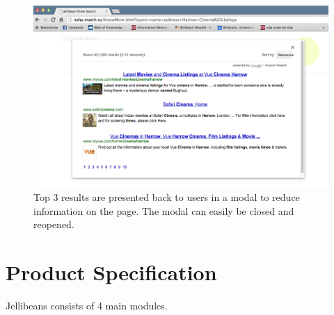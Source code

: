 \documentclass[a4paper, 11pt]{article}
\begin{document}
\begin{figure}[H]
\begin{center}
\includegraphics[scale=0.25]{ResultsModal}
\end{center}
\caption{Top 3 results are presented back to users in a modal to reduce information on the page. The modal can easily be closed and reopened.}
\label{resultsModal}
\end{figure}



\section{Product Specification}
Jellibeans consists of 4 main modules. 
\end{document}
